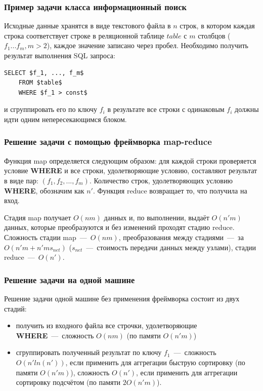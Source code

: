 \documentclass[12pt,a4paper,oneside]{extarticle}
\begin{document}
        \clearpage

        \subsubsection{Пример задачи класса информационный поиск}
        \label{sec:task_example}
            Исходные данные хранятся в виде текстового файла в $n$ строк, в котором каждая строка соответствует строке в реляционной таблице $table$ с $m$ столбцов ($f_1...f_m, m>2$), каждое значение записано через пробел. Необходимо получить результат выполнения SQL запроса:
            \lstset{language=SQL}
            \begin{lstlisting}[mathescape] 
    SELECT $f_1, ..., f_m$
    FROM $table$
    WHERE $f_1 > const$
            \end{lstlisting}
            и сгруппировать его по ключу $f_i$ в результате все строки с одинаковым $f_i$ должны идти одним непересекающимся блоком.

        \subsubsection{Решение задачи с помощью фреймворка map-reduce}
            
            Функция map определяется следующим образом: для каждой строки проверяется условие {\bf WHERE} и все строки, удолетворяющие условию, составляют результат в виде пар: $(f_1, f_2, ..., f_m)$. Количество строк, удолетворяющих условию {\bf WHERE}, обозначим как $n'$. Функция reduce возвращает то, что получила на вход.

            Стадия map получает $O(nm)$ данных и, по выполнении, выдаёт $O(n'm)$ данных, которые преобразуются и без изменений проходят стадию reduce. Сложность стадии map~---~$O(nm)$, преобразования между стадиями~---~за $O(n'm+n'ms_{net})$ ($s_{net}$~---~стоимость передачи данных между узлами), стадии reduce~---~$O(n')$. 

        \subsubsection{Решение задачи на одной машине}
            Решение задачи одной машине без применения фреймворка состоит из двух стадий: 
            \begin{itemize}
                \item получить из входного файла все строчки, удолетворяющие {\bf WHERE}~---~сложность $O(nm)$ (по памяти $O(n'm)$)
                \item сгруппировать полученный результат по ключу $f_1$~---~сложность $O(n'ln(n'))$, если применить для аггрегации быструю сортировку (по памяти $O(n'm)$), сложность $O(n')$, если применить для аггрегации сортировку подсчётом (по памяти $2O(n'm)$).
            \end{itemize}
\end{document}
